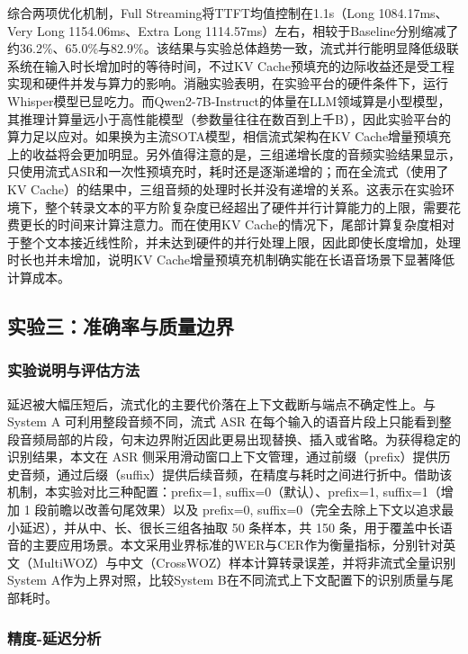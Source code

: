 \documentclass[UTF8,a4paper,zihao=5]{ctexart}
\begin{document}
综合两项优化机制，Full Streaming将TTFT均值控制在1.1s（Long 1084.17ms、Very Long 1154.06ms、Extra Long 1114.57ms）左右，相较于Baseline分别缩减了约36.2\%、65.0\%与82.9\%。该结果与实验总体趋势一致，流式并行能明显降低级联系统在输入时长增加时的等待时间，不过KV Cache预填充的边际收益还是受工程实现和硬件并发与算力的影响。消融实验表明，在实验平台的硬件条件下，运行Whisper模型已显吃力。而Qwen2-7B-Instruct的体量在LLM领域算是小型模型，其推理计算量远小于高性能模型（参数量往往在数百到上千B），因此实验平台的算力足以应对。如果换为主流SOTA模型，相信流式架构在KV Cache增量预填充上的收益将会更加明显。另外值得注意的是，三组递增长度的音频实验结果显示，只使用流式ASR和一次性预填充时，耗时还是逐渐递增的；而在全流式（使用了KV Cache）的结果中，三组音频的处理时长并没有递增的关系。这表示在实验环境下，整个转录文本的平方阶复杂度已经超出了硬件并行计算能力的上限，需要花费更长的时间来计算注意力。而在使用KV Cache的情况下，尾部计算复杂度相对于整个文本接近线性阶，并未达到硬件的并行处理上限，因此即使长度增加，处理时长也并未增加，说明KV Cache增量预填充机制确实能在长语音场景下显著降低计算成本。

\subsection{实验三：准确率与质量边界}

\subsubsection{实验说明与评估方法}

延迟被大幅压短后，流式化的主要代价落在上下文截断与端点不确定性上。与 System A 可利用整段音频不同，流式 ASR 在每个输入的语音片段上只能看到整段音频局部的片段，句末边界附近因此更易出现替换、插入或省略。为获得稳定的识别结果，本文在 ASR 侧采用滑动窗口上下文管理，通过前缀（prefix）提供历史音频，通过后缀（suffix）提供后续音频，在精度与耗时之间进行折中。借助该机制，本实验对比三种配置：prefix=1, suffix=0（默认）、prefix=1, suffix=1（增加 1 段前瞻以改善句尾效果）以及 prefix=0, suffix=0（完全去除上下文以追求最小延迟），并从中、长、很长三组各抽取 50 条样本，共 150 条，用于覆盖中长语音的主要应用场景。本文采用业界标准的WER与CER作为衡量指标，分别针对英文（MultiWOZ）与中文（CrossWOZ）样本计算转录误差，并将非流式全量识别System A作为上界对照，比较System B在不同流式上下文配置下的识别质量与尾部耗时。

\subsubsection{精度-延迟分析}
\end{document}
